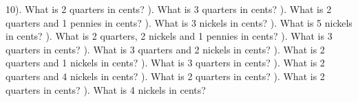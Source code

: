 \documentclass{article}%
\begin{document}
10). What is 2 quarters in cents?%
\newline%
\newline%
). What is 3 quarters in cents?%
\newline%
\newline%
). What is 2 quarters and 1 pennies in cents?%
\newline%
\newline%
). What is 3 nickels in cents?%
\newline%
\newline%
). What is 5 nickels in cents?%
\newline%
\newline%
). What is 2 quarters, 2 nickels and 1 pennies in cents?%
\newline%
\newline%
). What is 3 quarters in cents?%
\newline%
\newline%
). What is 3 quarters and 2 nickels in cents?%
\newline%
\newline%
). What is 2 quarters and 1 nickels in cents?%
\newline%
\newline%
). What is 3 quarters in cents?%
\newline%
\newline%
). What is 2 quarters and 4 nickels in cents?%
\newline%
\newline%
). What is 2 quarters in cents?%
\newline%
\newline%
). What is 2 quarters in cents?%
\newline%
\newline%
). What is 4 nickels in cents?%
\newline%
\newline%
\end{document}
